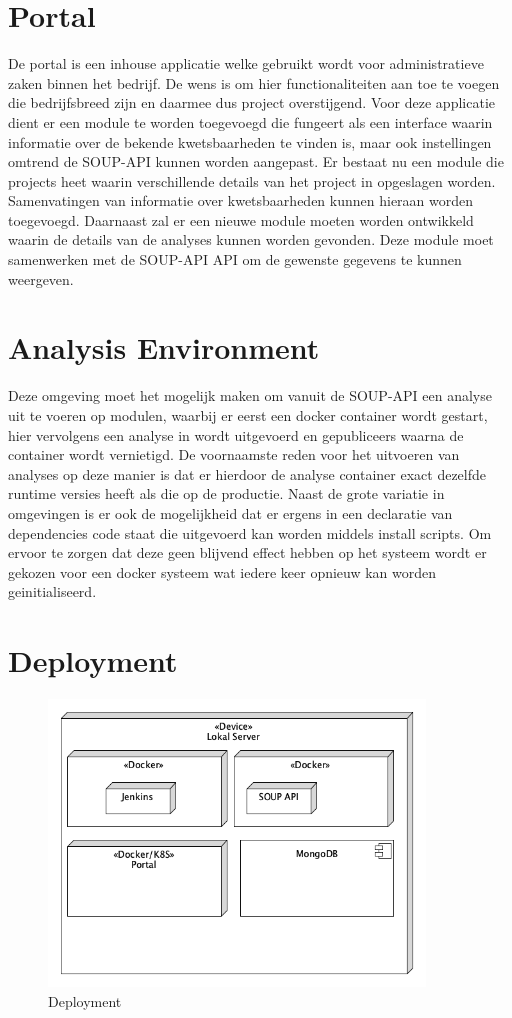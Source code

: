 \section{Portal}\label{sec:arch-portal} De portal is een inhouse applicatie welke gebruikt wordt voor administratieve zaken binnen het bedrijf. De wens is om hier functionaliteiten aan toe te voegen die bedrijfsbreed zijn en daarmee dus project overstijgend. Voor deze applicatie dient er een module te worden toegevoegd die fungeert als een interface waarin informatie over de bekende kwetsbaarheden te vinden is, maar ook instellingen omtrend de SOUP-API kunnen worden aangepast. Er bestaat nu een module die projects heet waarin verschillende details van het project in opgeslagen worden. Samenvatingen van informatie over kwetsbaarheden kunnen hieraan worden toegevoegd.
Daarnaast zal er een nieuwe module moeten worden ontwikkeld waarin de details van de analyses kunnen worden gevonden. Deze module moet samenwerken met de SOUP-API API om de gewenste gegevens te kunnen weergeven.

\section{Analysis Environment}\label{sec:analysis-environment}
Deze omgeving moet het mogelijk maken om vanuit de SOUP-API een analyse uit te voeren op modulen, waarbij er eerst een docker container wordt gestart, hier vervolgens een analyse in wordt uitgevoerd en gepubliceers waarna de container wordt vernietigd. De voornaamste reden voor het uitvoeren van analyses op deze manier is dat er hierdoor de analyse container exact dezelfde runtime versies heeft als die op de productie. Naast de grote variatie in omgevingen is er ook de mogelijkheid dat er ergens in een declaratie van dependencies code staat die uitgevoerd kan worden middels install scripts. Om ervoor te zorgen dat deze geen blijvend effect hebben op het systeem wordt er gekozen voor een docker systeem wat iedere keer opnieuw kan worden geinitialiseerd.

\section{Deployment}\label{sec:deployment}


\begin{figure}[bth]
    \myfloatalign
    \includegraphics[width=10cm]{gfx/umlet/exports/deployment}
    \caption{Deployment }
    \label{fig:deployment}
\end{figure}

